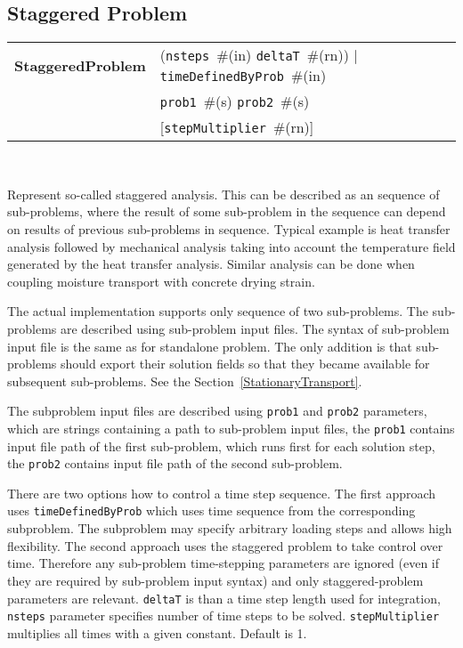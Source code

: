 \documentclass[a4paper]{article}
\newcommand{\param}[1]{\texttt{#1}} %
\newcommand{\optional}[1]{[#1]} %
\newcommand{\field}[2]{\param{#1}~\#{\tiny(#2)}} %
\newcommand{\optField}[2]{\optional{\field{#1}{#2}}}
\newcommand{\entKeywordInst}[1]{\textbf{#1}} %
\newenvironment{record}[1][]{\begin{tabular}{|ll}}{\end{tabular}\\}
\newcommand{\recentry}[2]{{#1}&{#2}\\}
\newcounter{rcc}
\newenvironment{record}[1][\textwidth]{\setcounter{rcc}{0}\rowcolors{1}{lightgray}{lightgray}\tabularx{#1}{llR} \hline}
               {\endtabularx}
\newcommand{\recentry}[2]{\ifthenelse{\value{rcc}>0}{$\backslash$ \\}{\setcounter{rcc}{1}}{#1}&{#2}&}
\begin{document}
\subsection{Staggered Problem}
\label{staggeredproblem}
\begin{record}
  \recentry{\entKeywordInst{StaggeredProblem}}{(\field{nsteps}{in} \field{deltaT}{rn}) $|$ \field{timeDefinedByProb}{in}}
  \recentry{}{\field{prob1}{s} \field{prob2}{s}}
  \recentry{}{\optField{stepMultiplier}{rn}}
\end{record}

Represent so-called staggered analysis. This can be described as an
sequence of sub-problems, where the result of some sub-problem in the
sequence can depend on results of previous sub-problems in sequence.
Typical example is heat transfer analysis followed by mechanical
analysis taking into account the temperature field generated by the
heat transfer analysis. Similar analysis can be done when coupling
moisture transport with concrete drying strain.

The actual implementation supports only sequence of two sub-problems.
The sub-problems are described using sub-problem input files. The
syntax of sub-problem input file is the same as for standalone
problem. The only addition is that sub-problems should export their
solution fields so that they became available for subsequent
sub-problems. See the Section~\ref{StationaryTransport}.

The subproblem input files are described using
\param{prob1} and \param{prob2} parameters, which are strings
containing a path to sub-problem input files, the \param{prob1}
contains input file path of the first sub-problem, which runs first
for each solution step, the \param{prob2} contains input file path of
the second sub-problem. 

There are two options how to control a time step sequence. The first approach
uses \param{timeDefinedByProb} which uses time sequence from the corresponding subproblem. 
The subproblem may specify arbitrary loading steps and allows high flexibility.
The second approach uses the staggered problem to take control over time. Therefore any
sub-problem time-stepping parameters are ignored (even if they are
required by sub-problem input syntax) and only staggered-problem
parameters are relevant. \param{deltaT} is than a time step length used for
integration, \param{nsteps} parameter specifies
number of time steps to be solved. \param{stepMultiplier} multiplies all 
times with a given constant. Default is 1.
\end{document}
